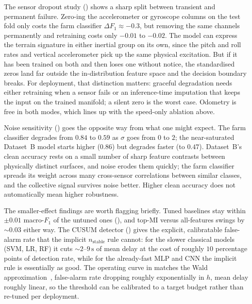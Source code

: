 The sensor dropout study () shows a sharp split between transient and permanent failure. Zero-ing the accelerometer or gyroscope columns on the test fold only costs the farm classifier $\Delta F_1 \approx -0.3$, but removing the same channels permanently and retraining costs only $-0.01$ to $-0.02$. The model can express the terrain signature in either inertial group on its own, since the pitch and roll rates and vertical accelerometer pick up the same physical excitation. But if it has been trained on both and then loses one without notice, the standardised zeros land far outside the in-distribution feature space and the decision boundary breaks. For deployment, that distinction matters: graceful degradation needs either retraining when a sensor fails or an inference-time imputation that keeps the input on the trained manifold; a silent zero is the worst case. Odometry is free in both modes, which lines up with the speed-only ablation above.

Noise sensitivity () goes the opposite way from what one might expect. The farm classifier degrades from $0.84$ to $0.59$ as $\sigma$ goes from $0$ to $2$; the near-saturated Dataset~B model starts higher ($0.86$) but degrades faster (to $0.47$). Dataset~B's clean accuracy rests on a small number of sharp feature contrasts between physically distinct surfaces, and noise erodes them quickly; the farm classifier spreads its weight across many cross-sensor correlations between similar classes, and the collective signal survives noise better. Higher clean accuracy does not automatically mean higher robustness.

The smaller-effect findings are worth flagging briefly. Tuned baselines stay within $\pm 0.01$ macro-$F_1$ of the untuned ones (), and top-MI versus all-features swings by $\sim 0.03$ either way. The CUSUM detector () gives the explicit, calibratable false-alarm rate that the implicit $n_{\text{stable}}$ rule cannot: for the slower classical models (SVM, LR, RF) it cuts $\sim 2$--$9\,\text{s}$ of mean delay at the cost of roughly $10$ percentage points of detection rate, while for the already-fast MLP and CNN the implicit rule is essentially as good. The operating curve in  matches the Wald approximation~\cite[Eq.~6.74]{Blanke2003}, false-alarm rate dropping roughly exponentially in $h$, mean delay roughly linear, so the threshold can be calibrated to a target budget rather than re-tuned per deployment.

